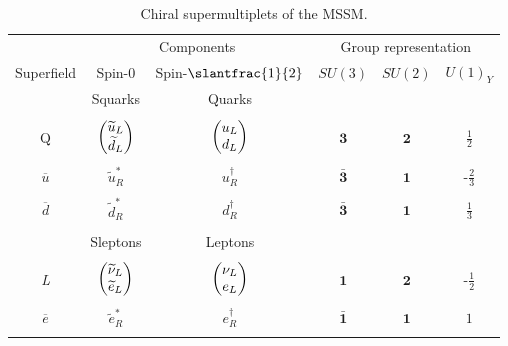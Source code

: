 \begin{table}
  \caption{Chiral supermultiplets of the MSSM.}
  \begin{tabular}{cccccc}
    \toprule
                    & \multicolumn{2}{c}{Components}                  & \multicolumn{3}{c}{Group representation} \\ \cmidrule(r){2-3}\cmidrule(l){4-6}
    Superfield      & Spin-0                                          & Spin-$\slantfrac{1}{2}$                                                        & $SU(3)$            & $SU(2)$      & $U(1)_Y$\\\midrule
                    & Squarks                                         & Quarks                                                                         &                    &              & \\ \cmidrule(r){2-3}\\
    Q               & $\begin{pmatrix} \widetilde{u}_L \\ \widetilde{d}_L\end{pmatrix}$   & $\begin{pmatrix} u_L \\ d_L\end{pmatrix}$                                                          & $\mathbf{3}$       & $\mathbf{2}$ & $\frac{1}{2}$\\\\
    $\overline{u}$  & $\tilde{u}_R^*$                                 & $u_R^\dagger$                                                                  & $\bar{\mathbf{3}}$ & $\mathbf{1}$ & -$\frac{2}{3}$\\\\
    $\overline{d}$  & $\tilde{d}_R^*$                                 & $d_R^\dagger$                                                                  & $\bar{\mathbf{3}}$ & $\mathbf{1}$ & $\frac{1}{3}$\\\\\cmidrule{2-3}
                    & Sleptons                                        & Leptons                                                                        &                    &              & \\ \cmidrule{2-3}\\
    \emph{L}        & $\begin{pmatrix} \widetilde{\nu}_L \\ \widetilde{e}_L\end{pmatrix}$ & $\begin{pmatrix} \nu_L \\ e_L\end{pmatrix}$                                                        & $\mathbf{1}$       & $\mathbf{2}$ & -$\frac{1}{2}$\\\\
    $\overline{e}$  & $\tilde{e}_R^*$                                 & $e_R^\dagger$                                                                  & $\bar{\mathbf{1}}$ & $\mathbf{1}$ & $1$\\\\\cmidrule{2-3}

\end{tabular}
\end{table}
